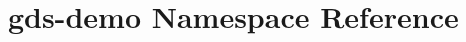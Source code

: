 \hypertarget{namespacegds-demo}{\section{gds-\/demo Namespace Reference}
\label{namespacegds-demo}
}
